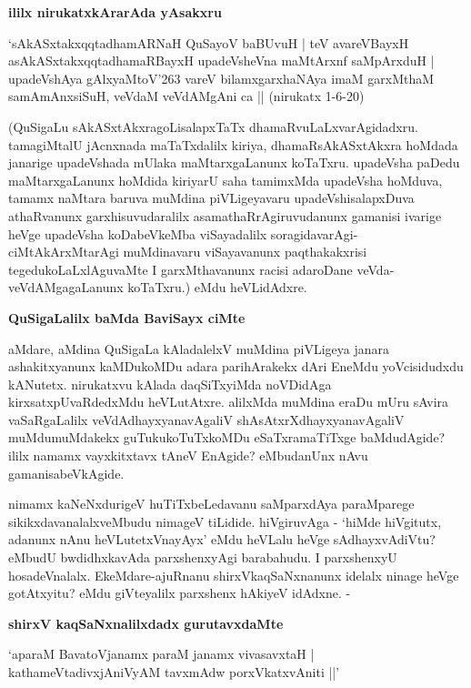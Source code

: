 \noindent
\textbf{ililx nirukatxkArarAda yAsakxru}

\begin{shloka}
`sAkASxtakxqqtadhamARNaH QuSayoV baBUvuH | teV avareVBayxH\\\label{106}
asAkASxtakxqqtadhamaRBayxH upadeVsheVna maMtArxnf saMpArxduH |\\
upadeVshAya gAlxyaMtoV\char'263 vareV bilamxgarxhaNAya imaM garxMthaM\\
samAmAnxsiSuH, veVdaM veVdAMgAni ca || (nirukatx 1-6-20)
\end{shloka}

(QuSigaLu sAkASxtAkxragoLisalapxTaTx dhamaRvuLaLxvarAgidadxru. tamagiMtalU jAcnxnada maTaTxdalilx kiriya, dhamaRsAkASxtAkxra hoMdada janarige upadeVshada mUlaka maMtarxgaLanunx koTaTxru. upadeVsha paDedu maMtarxgaLanunx hoMdida kiriyarU saha tamimxMda upadeVsha hoMduva, tamamx naMtara baruva muMdina piVLigeyavaru upadeVshisalapxDuva athaRvanunx garxhisuvudaralilx asamathaRrAgiruvudanunx gamanisi ivarige heVge upadeVsha koDabeVkeMba viSayadalilx soragidavarAgi-ciMtAkArxMtarAgi muMdinavaru viSayavanunx paqthakakxrisi tegedukoLaLxlAguvaMte I garxMthavanunx racisi adaroDane veVda-veVdAMgagaLanunx koTaTxru.) eMdu heVLidAdxre.

\noindent
\textbf{QuSigaLalilx baMda BaviSayx ciMte}\label{page106}

aMdare, aMdina QuSigaLa kAladalelxV muMdina piVLigeya janara ashakitxyanunx kaMDukoMDu adara parihArakekx dAri EneMdu yoVcisidudxdu kANutetx. nirukatxvu kAlada daqSiTxyiMda noVDidAga kirxsatxpUvaRdedxMdu heVLutAtxre. alilxMda muMdina eraDu mUru sAvira vaSaRgaLalilx veVdAdhayxyanavAgaliV shAsAtxrXdhayxyanavAgaliV muMdumuMdakekx guTukukoTuTxkoMDu eSaTxramaTiTxge baMdudAgide? ililx namamx vayxkitxtavx tAneV EnAgide? eMbudanUnx nAvu gamanisabeVkAgide.

nimamx kaNeNxdurigeV huTiTxbeLedavanu saMparxdAya paraMparege sikikxdavanalalxveMbudu nimageV tiLidide. hiVgiruvAga - `hiMde hiVgitutx, adanunx nAnu heVLutetxVnayAyx' eMdu heVLalu heVge sAdhayxvAdiVtu? eMbudU bwdidhxkavAda parxshenxyAgi barabahudu. I parxshenxyU hosadeVnalalx. EkeMdare-ajuRnanu shirxVkaqSaNxnanunx idelalx ninage heVge gotAtxyitu? eMdu giVteyalilx parxshenx hAkiyeV idAdxne. -

\noindent
\textbf{shirxV kaqSaNxnalilxdadx gurutavxdaMte}\label{page107}

\begin{shloka}
`aparaM BavatoVjanamx paraM janamx vivasavxtaH |\\\label{107}
kathameVtadivxjAniVyAM tavxmAdw porxVkatxvAniti ||'
\end{shloka}

